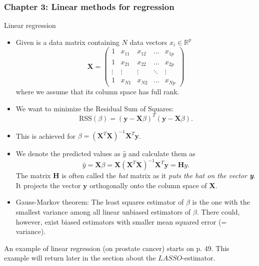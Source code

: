\subsubsection*{Chapter 3: Linear methods for regression}
Linear regression
\begin{itemize}
    \item Given is a data matrix containing $N$ data vectors $x_i \in \mathbb{R}^p$ \begin{equation*}
        \textbf{X} = \begin{pmatrix}
        1 & x_{11} & x_{12} & \dots & x_{1p}\\
        1 & x_{21} & x_{22} & \dots & x_{2p}\\
        \vdots & \vdots & \vdots & \ddots & \vdots\\
        1 & x_{N1} & x_{N2} & \dots & x_{Np}
        \end{pmatrix}
    \end{equation*}
    where we assume that its column space has full rank.
    \item We want to minimize the Residual Sum of Squares: \begin{equation*}
        \text{RSS}(\beta) = (\textbf{y} - \textbf{X}\beta)^T(\textbf{y} - \textbf{X}\beta).
    \end{equation*}
    \item This is achieved for $\beta = (\textbf{X}^T\textbf{X})^{-1}\textbf{X}^T\textbf{y}$.
    \item We denote the predicted values as $\hat{y}$ and calculate them as \begin{equation*}
        \hat{y} = \textbf{X}\beta = \textbf{X}(\textbf{X}^T\textbf{X})^{-1}\textbf{X}^T\textbf{y} = \textbf{H}y.
    \end{equation*}
    The matrix $\textbf{H}$ is often called the \textit{hat} matrix as it \textit{puts the hat on the vector \textbf{y}}. It projects the vector $\textbf{y}$ orthogonally onto the column space of \textbf{X}.
    \item Gauss-Markov theorem: The least squares estimator of $\beta$ is the one with the smallest variance among all linear unbiased estimators of $\beta$. There could, however, exist biased estimators with smaller mean squared error (= variance).
\end{itemize}
An example of linear regression (on prostate cancer) starts on p. 49. This example will return later in the section about the $LASSO$-estimator.\\
\\
